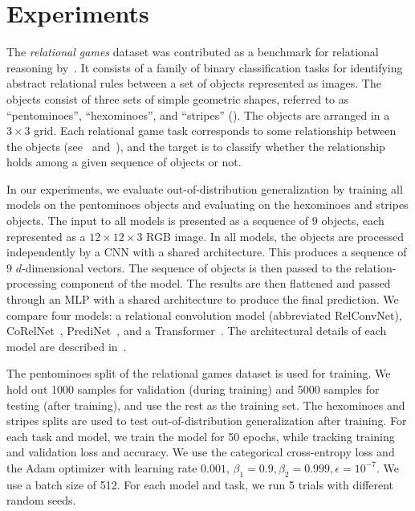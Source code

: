 \section{Experiments}\label{sec:experiments}

The \textit{relational games} dataset was contributed as a benchmark for relational reasoning by~\citep{shanahanExplicitlyRelationalNeural}. It consists of a family of binary classification tasks for identifying abstract relational rules between a set of objects represented as images. The objects consist of three sets of simple geometric shapes, referred to as ``pentominoes'', ``hexominoes'', and ``stripes'' (). The objects are arranged in a $3 \times 3$ grid. Each relational game task corresponds to some relationship between the objects (see~ and~), and the target is to classify whether the relationship holds among a given sequence of objects or not.

In our experiments, we evaluate out-of-distribution generalization by training all models on the pentominoes objects and evaluating on the hexominoes and stripes objects. The input to all models is presented as a sequence of $9$ objects, each represented as a $12 \times 12 \times 3$ RGB image. In all models, the objects are processed independently by a CNN with a shared architecture. This produces a sequence of $9$ $d$-dimensional vectors. The sequence of objects is then passed to the relation-processing component of the model. The results are then flattened and passed through an MLP with a shared architecture to produce the final prediction. We compare four models: a relational convolution model (abbreviated RelConvNet), CoRelNet~\citep{kergNeuralArchitecture2022}, PrediNet~\citep{shanahanExplicitlyRelationalNeural}, and a Transformer~\citep{vaswani2017attention}. The architectural details of each model are described in~.

The pentominoes split of the relational games dataset is used for training. We hold out 1000 samples for validation (during training) and 5000 samples for testing (after training), and use the rest as the training set. The hexominoes and stripes splits are used to test out-of-distribution generalization after training. For each task and model, we train the model for 50 epochs, while tracking training and validation loss and accuracy. We use the categorical cross-entropy loss and the Adam optimizer with learning rate $0.001$, $\beta_1 = 0.9, \beta_2 = 0.999, \epsilon = 10^{-7}$. We use a batch size of 512. For each model and task, we run 5 trials with different random seeds.

